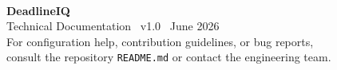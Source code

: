 \documentclass[12pt,a4paper]{report}
\begin{document}
\newpage
\thispagestyle{empty}
\pagecolor{primary}
\color{white}
\vspace*{\fill}
\begin{center}
  \\[1em]
  {\Large\bfseries DeadlineIQ}\\[0.5em]
  {\color{accentlight} Technical Documentation \textbullet\ v1.0 \textbullet\ June 2026}\\[0.8em]
  {\small\color{muted}
    For configuration help, contribution guidelines, or bug reports,\\
    consult the repository \texttt{README.md} or contact the engineering team.
  }\\[1em]
\end{center}
\vspace*{\fill}
\nopagecolor
\end{document}
